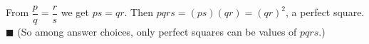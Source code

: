 From $\dfrac pq=\dfrac rs$ we get $ps=qr$. Then $pqrs=(ps)(qr)=(qr)^2$, a perfect square. $\blacksquare$ (So among answer choices, only perfect squares can be values of $pqrs$.)

